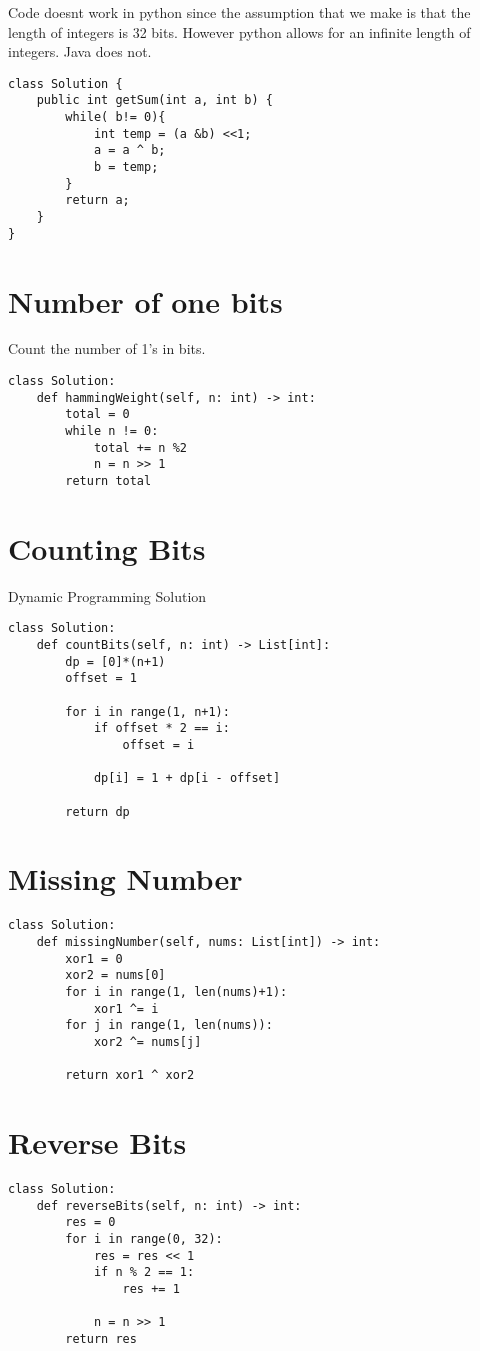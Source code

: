 \documentclass[24pt, a4]{article}
\begin{document}
Code doesnt work in python since the assumption that we make is that the length of integers is 32 bits. However python allows for an infinite length of integers. Java does not.
\begin{lstlisting}
class Solution {
    public int getSum(int a, int b) {
        while( b!= 0){
            int temp = (a &b) <<1;
            a = a ^ b;
            b = temp;
        }
        return a;
    }
}
\end{lstlisting}

\section{Number of one bits}

Count the number of 1's in bits.
\begin{lstlisting}
class Solution:
    def hammingWeight(self, n: int) -> int:
        total = 0
        while n != 0:
            total += n %2 
            n = n >> 1
        return total
\end{lstlisting}

\section{Counting Bits}
Dynamic Programming Solution
\begin{lstlisting}
class Solution:
    def countBits(self, n: int) -> List[int]:
        dp = [0]*(n+1)
        offset = 1
        
        for i in range(1, n+1):
            if offset * 2 == i:
                offset = i
            
            dp[i] = 1 + dp[i - offset]
        
        return dp
\end{lstlisting}

\section{Missing Number}
\begin{lstlisting}
class Solution:
    def missingNumber(self, nums: List[int]) -> int:
        xor1 = 0
        xor2 = nums[0]
        for i in range(1, len(nums)+1):
            xor1 ^= i
        for j in range(1, len(nums)):
            xor2 ^= nums[j]
        
        return xor1 ^ xor2
\end{lstlisting}

\section{Reverse Bits}
\begin{lstlisting}
class Solution:
    def reverseBits(self, n: int) -> int:
        res = 0
        for i in range(0, 32):
            res = res << 1
            if n % 2 == 1:
                res += 1
                
            n = n >> 1
        return res
\end{lstlisting}
\end{document}

